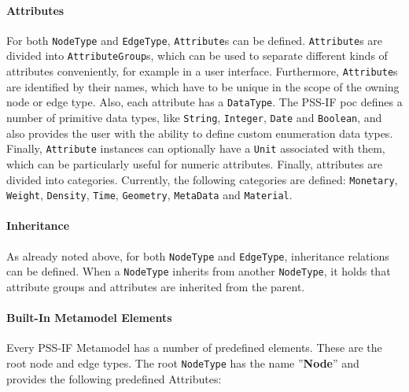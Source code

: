 \paragraph{Attributes}

For both \texttt{NodeType} and \texttt{EdgeType}, \texttt{Attribute}s can be defined. \texttt{At\-tribute}s are divided into \texttt{AttributeGroup}s, which can be used to separate different kinds of attributes conveniently, for example in a user interface. Furthermore, \texttt{Attribute}s are identified by their names, which have to be unique in the scope of the owning node or edge type. Also, each attribute has a \texttt{DataType}. The PSS-IF \gls{poc} defines a number of primitive data types, like \texttt{String}, \texttt{Integer}, \texttt{Date} and \texttt{Boolean}, and also provides the user with the ability to define custom enumeration data types. Finally, \texttt{Attribute} instances can optionally have a \texttt{Unit} associated with them, which can be particularly useful for numeric attributes. Finally, attributes are divided into categories. Currently, the following categories are defined: \texttt{Monetary}, \texttt{Weight}, \texttt{Density}, \texttt{Time}, \texttt{Geometry}, \texttt{MetaData} and \texttt{Material}.

\paragraph{Inheritance}

As already noted above, for both \texttt{NodeType} and \texttt{EdgeType}, inheritance relations can be defined. When a \texttt{NodeType} inherits from another \texttt{NodeType}, it holds that attribute groups and attributes are inherited from the parent.

\paragraph{Built-In Metamodel Elements}

Every PSS-IF Metamodel has a number of predefined elements. These are the root node and edge types. The root \texttt{NodeType} has the name ''\textbf{Node}'' and provides the following predefined Attributes:

